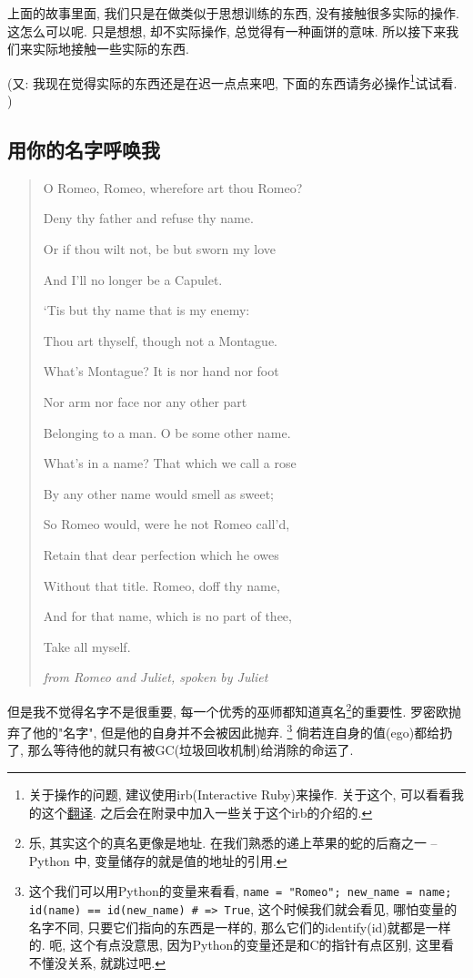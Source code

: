 上面的故事里面, 我们只是在做类似于思想训练的东西, 没有接触很多实际的操作. 这怎么可以呢. 只是想想, 却不实际操作, 总觉得有一种画饼的意味. 所以接下来我们来实际地接触一些实际的东西. 

(又: 我现在觉得实际的东西还是在迟一点点来吧, 下面的东西请务必操作\footnote{关于操作的问题, 建议使用irb(Interactive Ruby)来操作. 关于这个, 可以看看我的这个\href{https://li-yiyang.github.io/ruby/why's_(poignant)_guide_to_ruby/why's-poignant-guide/}{翻译}. 之后会在附录中加入一些关于这个irb的介绍的. }试试看. )

\subsection{用你的名字呼唤我}
\begin{quotation}
  O Romeo, Romeo, wherefore art thou Romeo?

  Deny thy father and refuse thy name.

  Or if thou wilt not, be but sworn my love

  And I'll no longer be a Capulet.

  `Tis but thy name that is my enemy:

  Thou art thyself, though not a Montague.

  What's Montague? It is nor hand nor foot

  Nor arm nor face nor any other part

  Belonging to a man. O be some other name.

  What's in a name? That which we call a rose

  By any other name would smell as sweet;

  So Romeo would, were he not Romeo call'd,

  Retain that dear perfection which he owes

  Without that title. Romeo, doff thy name,

  And for that name, which is no part of thee,

  Take all myself.

  \emph{from Romeo and Juliet, spoken by Juliet}
\end{quotation}

但是我不觉得名字不是很重要, 每一个优秀的巫师都知道真名\footnote{乐, 其实这个的真名更像是地址. 在我们熟悉的递上苹果的蛇的后裔之一 -- Python 中, 变量储存的就是值的地址的引用. }的重要性. 罗密欧抛弃了他的"名字", 但是他的自身并不会被因此抛弃. \footnote{这个我们可以用Python的变量来看看, \texttt{name = "Romeo"; new_name = name; id(name) == id(new_name) # => True}, 这个时候我们就会看见, 哪怕变量的名字不同, 只要它们指向的东西是一样的, 那么它们的identify(id)就都是一样的. 呃, 这个有点没意思, 因为Python的变量还是和C的指针有点区别, 这里看不懂没关系, 就跳过吧. } 倘若连自身的值(ego)都给扔了, 那么等待他的就只有被GC(垃圾回收机制)给消除的命运了. 

